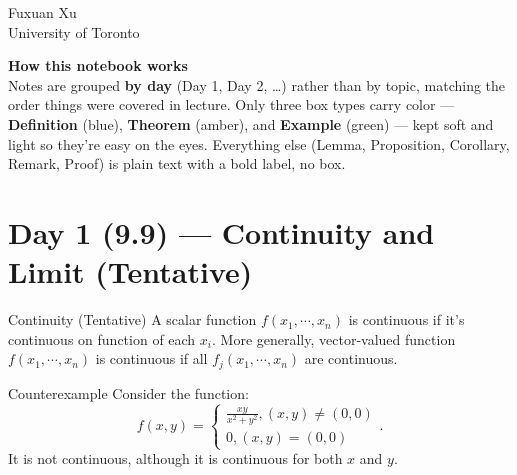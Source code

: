 \documentclass[11pt]{article}
\newenvironment{definition}[1]{\begin{defbox}{#1}{}}{\end{defbox}}
\newenvironment{example}[1]{\begin{exbox}{#1}{}}{\end{exbox}}
\theoremstyle{quiet}
\theoremstyle{quietremark}
\begin{document}
\begin{titlepage}
\begin{tikzpicture}[scale=1.0]
\end{tikzpicture}

\vspace{0.3cm}


\vspace{1.4cm}
{\large Fuxuan Xu}\\[0.2cm]
{\large University of Toronto}

\vfill

\begin{tcolorbox}[colback=black!2, colframe=neutralColor!35, width=0.7\textwidth,
 arc=1.5mm, boxrule=0.4pt]
\centering\small
\textbf{How this notebook works}\\[3pt]
Notes are grouped \textbf{by day} (Day 1, Day 2, \dots) rather than by topic,
matching the order things were covered in lecture. Only three box types carry
color --- \textcolor{defColor!75!black}{\textbf{Definition}} (blue),
\textcolor{thmColor!60!black}{\textbf{Theorem}} (amber), and
\textcolor{exColor!70!black}{\textbf{Example}} (green) --- kept soft and light
so they're easy on the eyes. Everything else (Lemma, Proposition, Corollary,
Remark, Proof) is plain text with a bold label, no box.
\end{tcolorbox}

\vspace{1.0cm}
\end{titlepage}

\tableofcontents
\newpage

\section{Day 1 (9.9) --- Continuity and Limit (Tentative)}
\begin{definition}{Continuity (Tentative)}
A scalar function $f(x_1,\cdots,x_n)$ is continuous if it's continuous on function of each $x_i$. More generally, vector-valued function $f(x_1,\cdots,x_n)$ is continuous if all $f_j(x_1,\cdots,x_n)$ are continuous.
\end{definition}

\begin{example}{Counterexample}
Consider the function:
\[
f(x,y)=\begin{cases}\displaystyle\frac{xy}{x^2+y^2},(x,y)\ne (0,0)\\0,(x,y)=(0,0)\end{cases}.
\]
It is not continuous, although it is continuous for both $x$ and $y$.
\end{example}
\end{document}
